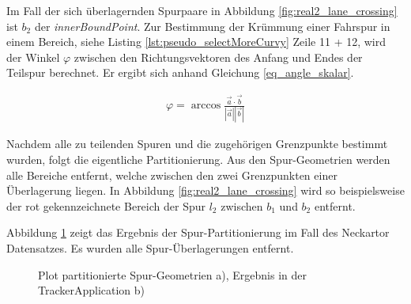 Im Fall der sich überlagernden Spurpaare in Abbildung \ref{fig:real2_lane_crossing} ist $b_2$ der \textit{innerBoundPoint}.
Zur Bestimmung der Krümmung einer Fahrspur in einem Bereich, siehe Listing \ref{lst:pseudo_selectMoreCurvy}
Zeile 11 + 12, wird der Winkel $\varphi$ zwischen den Richtungsvektoren des Anfang und Endes der Teilspur berechnet.
Er ergibt sich anhand Gleichung \ref{eq_angle_skalar}.

\begin{ceqn}
\begin{align}
\label{eq_angle_skalar}
    \varphi=\arccos \frac{\vec a \cdot \vec b}{|\vec a| |\vec b|}
\end{align}
\end{ceqn}

Nachdem alle zu teilenden Spuren und die zugehörigen Grenzpunkte
bestimmt wurden, folgt die eigentliche Partitionierung. Aus den Spur-Geometrien werden alle Bereiche
entfernt, welche zwischen den zwei Grenzpunkten einer Überlagerung liegen. In Abbildung \ref{fig:real2_lane_crossing}
wird so beispielsweise der rot gekennzeichnete Bereich der Spur $l_2$ zwischen $b_1$ und $b_2$ entfernt.

Abbildung \ref{fig:real2_results_partitioning} zeigt das Ergebnis der Spur-Partitionierung im Fall des
Neckartor Datensatzes. Es wurden alle Spur-Überlagerungen entfernt.

\begin{figure}[H]
    \centering
    \qquad
    \caption{Plot partitionierte Spur-Geometrien a), Ergebnis in der TrackerApplication b)}
    \label{fig:real2_results_partitioning}
\end{figure}

